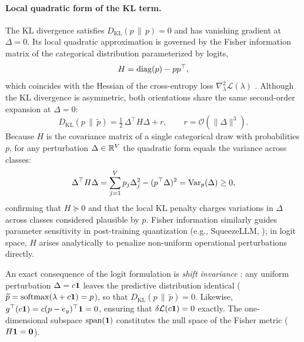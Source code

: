 \paragraph{Local quadratic form of the KL term.}
The KL divergence satisfies $D_{\mathrm{KL}}(p\,\|\,p)=0$ and has vanishing gradient
at $\Delta=0$. Its local quadratic approximation is governed by the Fisher
information matrix of the categorical distribution parameterized by logits,
\begin{equation*}
  H = \operatorname{diag}(p) - pp^\top,
\end{equation*}
which coincides with the Hessian of the cross-entropy loss $\nabla^2_\lambda \mathcal L(\lambda)$
\citep[Section~6]{martens2020new}. Although the KL divergence is asymmetric, both
orientations share the same second-order expansion at $\Delta=0$:
\begin{equation}
  D_{\mathrm{KL}}(p\,\|\,\widetilde p)
  =\tfrac12\,\Delta^\top H\Delta+r,
  \qquad r=\mathcal O(\|\Delta\|^3).
  \label{eq:logit-kl-second-order}
\end{equation}
Because $H$ is the covariance matrix of a single categorical draw with probabilities $p$,
for any perturbation $\Delta \in \mathbb{R}^V$ the quadratic form equals the variance across classes:
\begin{equation}
  \Delta^\top H \Delta = \sum_{j=1}^V p_j \Delta_j^2 - (p^\top\Delta)^2 = \operatorname{Var}_p(\Delta) \ge 0,
  \label{eq:fisher-variance-identity}
\end{equation}
confirming that $H \succeq 0$ and that the local KL penalty charges variations in
$\Delta$ across classes considered plausible by $p$.
Fisher information similarly guides parameter sensitivity in post-training
quantization (e.g., SqueezeLLM, \citealp{kim2024squeezellm}); in logit space,
$H$ arises analytically to penalize non-uniform operational perturbations directly.

An exact consequence of the logit formulation is \emph{shift invariance}
\citep{blanchard2021accurately}: any uniform perturbation $\Delta = c\mathbf{1}$ leaves
the predictive distribution identical ($\widetilde p = \operatorname{softmax}(\lambda + c\mathbf{1}) = p$),
so that $D_{\mathrm{KL}}(p\,\|\,\widetilde p) = 0$.
Likewise, $g^\top (c\mathbf{1}) = c(p-e_y)^\top\mathbf{1} = 0$, ensuring that $\delta\mathcal L(c\mathbf{1}) = 0$
exactly. The one-dimensional subspace $\operatorname{span}(\mathbf{1})$ constitutes the null
space of the Fisher metric ($H\mathbf{1} = \mathbf{0}$).


